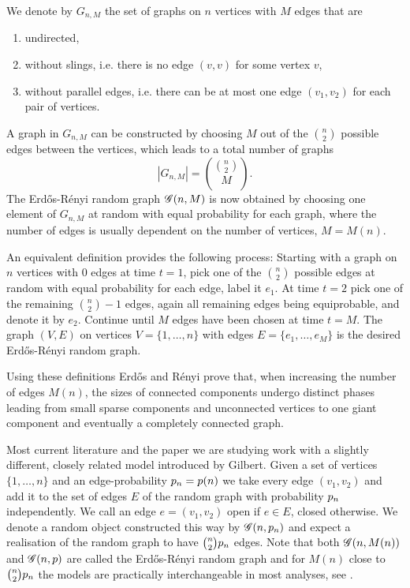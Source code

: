 We denote by $G_{n,M}$ the set of graphs on $n$ vertices with $M$ edges that are
\begin{enumerate}
	\item undirected,
	\item without slings, i.e. there is no edge $(v,v)$ for some vertex $v$,
	\item without parallel edges, i.e. there can be at most one edge $(v_1, v_2)$ for each pair of vertices.
\end{enumerate}
A graph in $G_{n,M}$ can be constructed by choosing $M$ out of the $\binom{n}{2}$ possible edges between the vertices,
which leads to a total number of graphs
\begin{equation*}
	|G_{n,M}| = \binom{\binom{n}{2}}{M}.
\end{equation*}
The Erd\H{o}s-Rényi random graph $\mathscr{G}(n, M)$ is now obtained by choosing one element of $G_{n,M}$ at random
with equal probability for each graph, where the number of edges is usually dependent on the number of vertices, $M = M(n)$.

An equivalent definition provides the following process:
Starting with a graph on $n$ vertices with $0$ edges at time $t=1$, 
pick one of the $\binom{n}{2}$ possible edges at random with equal probability for each edge,
label it $e_1$.
At time $t=2$ pick one of the remaining $\binom{n}{2}-1$ edges, again all remaining edges being equiprobable,
and denote it by $e_2$.
Continue until $M$ edges have been chosen at time $t=M$.
The graph $(V,E)$ on vertices $V = \{1, \dots, n\}$ with edges $E = \{e_1, \dots, e_M\}$ is the desired Erd\H{o}s-Rényi random graph.

Using these definitions Erd\H{o}s and Rényi prove that,
when increasing the number of edges $M(n)$,
the sizes of connected components undergo distinct phases leading from small sparse components and unconnected vertices
to one giant component and eventually a completely connected graph.

Most current literature and the paper we are studying work with a slightly different, closely related model introduced by Gilbert.
Given a set of vertices $\{1, \dots, n\}$ and an edge-probability $p_n = p(n)$
we take every edge $(v_1, v_2)$ and add it to the set of edges $E$ of the random graph with probability $p_n$ independently.
We call an edge $e = (v_1, v_2)$ open if $e \in E$, closed otherwise.
We denote a random object constructed this way by $\mathscr{G}(n, p_n)$\label{I: gnt} and expect a realisation of the random graph to have $\binom{n}{2}p_n$ edges.
Note that both $\mathscr{G}(n, M(n))$ and $\mathscr{G}(n, p)$ are called the Erd\H{o}s-Rényi random graph 
and for $M(n)$ close to $\binom{n}{2}p_n$ the models are practically interchangeable in most analyses, see \cite[p.38]{Bollobas.2001}.

